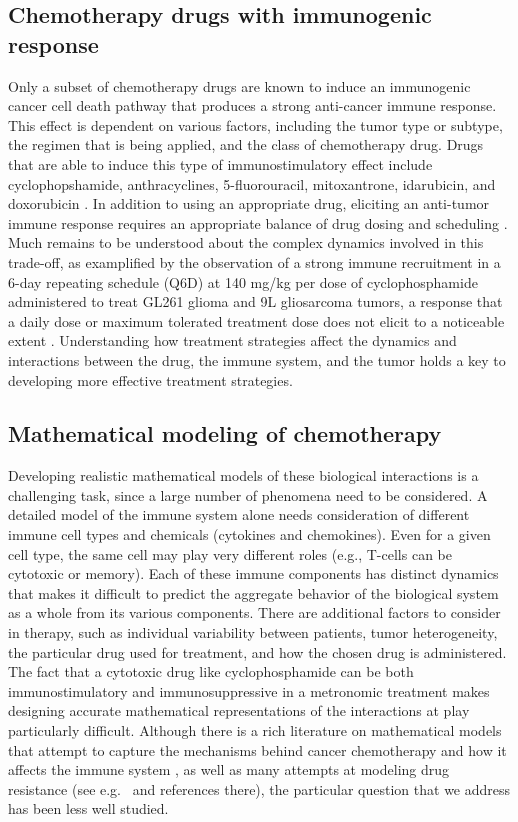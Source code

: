 \subsection{Chemotherapy drugs with immunogenic response}
Only a subset of chemotherapy drugs are known to induce an immunogenic cancer cell death pathway that produces a strong anti-cancer immune response. This effect is dependent on various factors, including the tumor type or subtype, the regimen that is being applied, and the class of chemotherapy drug. Drugs that are able to induce this type of immunostimulatory effect include cyclophopshamide, anthracyclines, 5-fluorouracil, mitoxantrone, idarubicin, and doxorubicin \cite{zitvogul2008,chen2013chemoimmunotherapy,bracci2014immune,vacchelli2014trial,pol2015trial}. In addition to using an appropriate drug, eliciting an anti-tumor immune response requires an appropriate balance of drug dosing and scheduling \cite{wu2018immunogenic,park2019goldilocks,tran2020delicate}. Much remains to be understood about the complex dynamics involved in this trade-off, as examplified by the observation of a strong immune recruitment in a 6-day repeating schedule (Q6D) at 140 mg/kg per dose of cyclophosphamide administered to treat GL261 glioma and 9L gliosarcoma tumors, a response that a daily dose or maximum tolerated treatment dose does not elicit to a noticeable extent \cite{wu2014metronomic,chen2014intermittent,doloff2012vegf}. Understanding how treatment strategies affect the dynamics and interactions between the drug, the immune system, and the tumor holds a key to developing more effective treatment strategies.

\subsection{Mathematical modeling of chemotherapy}
Developing realistic mathematical models of these biological interactions is a challenging task, since a large number of phenomena need to be considered. A detailed model of the immune system alone needs consideration of different immune cell types and chemicals (cytokines and chemokines). Even for a given cell type, the same cell may play very different roles (e.g., T-cells can be cytotoxic or memory). Each of these immune components has distinct dynamics that makes it difficult to predict the aggregate behavior of the biological system as a whole from its various components. There are additional factors to consider in therapy, such as individual variability between patients, tumor heterogeneity, the particular drug used for treatment, and how the chosen drug is administered. The fact that a cytotoxic drug like cyclophosphamide can be both immunostimulatory and immunosuppressive in a metronomic treatment makes designing accurate mathematical representations of the interactions at play particularly difficult. Although there is a rich literature on mathematical models that attempt to capture the mechanisms behind cancer chemotherapy and how it affects the immune system \cite{de2005clinical,de2006mixed,ciccolini2017pharmacokinetics,park2019goldilocks}, as well as many attempts at modeling drug resistance (see e.g.\ \cite{greene2019mathematical} and references there), the particular question that we address has been less well studied.

